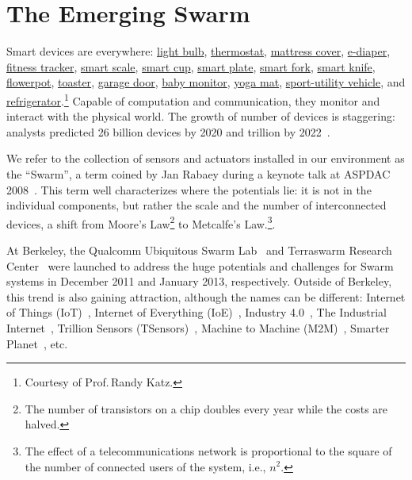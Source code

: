 \section{The Emerging Swarm}
\label{sec:emerging-swarm}

Smart devices are everywhere: \href{http://ilumi.co/}{light bulb},
\href{https://nest.com/}{thermostat}, \href{http://lunasleep.com/}{mattress
  cover}, \href{https://www.indiegogo.com/projects/smart-diapers}{e-diaper},
\href{https://www.fitbit.com/}{fitness tracker},
\href{https://www.fitbit.com/aria}{smart scale},
\href{https://www.myvessyl.com/}{smart cup},
\href{https://www.kickstarter.com/projects/1816678675/smartplate-instantly-track-and-analyze-everything}{smart
  plate},
\href{http://www.amazon.com/HAPILABS-102-HAPIfork-Bluetooth-Enabled-Smart/dp/B00FRPCPEC}{smart
  fork}, \href{http://electroluxdesignlab.com/en/submission/smart-knife/}{smart
  knife},
\href{http://www.clickandgrow.com/pages/what-is-click-grow}{flowerpot},
\href{http://www.williams-sonoma.com/products/breville-die-cast-2-slice-stainless-steel-smart-toaster/}{toaster},
\href{https://garageio.com/}{garage door},
\href{http://www2.withings.com/us/en/products/baby/smart-baby-monitor}{baby
  monitor},
\href{https://www.indiegogo.com/projects/smartmat-the-world-s-first-intelligent-yoga-mat}{yoga
  mat},
\href{http://usnews.rankingsandreviews.com/cars-trucks/best-cars-blog/2013/02/2015_GM_Vehicles_Will_Get_Wi-Fi_Internet_Access/}{sport-utility
  vehicle}, and
\href{http://www.samsung.com/us/appliances/refrigerators/RF28HMELBSR/AA}{refrigerator}.\footnote{Courtesy
  of Prof.\,Randy Katz.} Capable of computation and communication, they monitor
and interact with the physical world.  The growth of number of devices is
staggering: analysts predicted 26 billion devices by 2020 and trillion by
2022~\cite{middleton2013forecast}.

We refer to the collection of sensors and actuators installed in our environment
as the ``Swarm'', a term coined by Jan Rabaey during a keynote talk at ASPDAC
2008~\cite{rabaey2008brand}. This term well characterizes where the potentials
lie: it is not in the individual components, but rather the scale and the number
of interconnected devices, a shift from Moore's Law\footnote{The number of
  transistors on a chip doubles every year while the costs are halved.} to
Metcalfe's Law.\footnote{The effect of a telecommunications network is
  proportional to the square of the number of connected users of the system,
  i.e., $n^2$.}.

At Berkeley, the Qualcomm Ubiquitous Swarm Lab~\cite{swarmlab} and Terraswarm
Research Center~\cite{terraswarm} were launched to address the huge potentials
and challenges for Swarm systems in December 2011 and January 2013,
respectively. Outside of Berkeley, this trend is also gaining attraction,
although the names can be different: Internet of Things
(IoT)~\cite{atzori2010internet}, Internet of Everything
(IoE)~\cite{bradley2013internet}, Industry 4.0~\cite{lasi2014industry}, The
Industrial Internet~\cite{eigner2018industrial}, Trillion Sensors
(TSensors)~\cite{bogue2014towards}, Machine to Machine
(M2M)~\cite{anton2014machine}, Smarter Planet~\cite{palmisano2008smarter}, etc.

